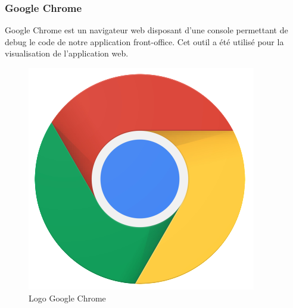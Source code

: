 \subsubsection{Google Chrome}
\noindent\begin{minipage}{0.69\textwidth}
Google Chrome est un navigateur web disposant d'une console permettant de debug le code de notre application front-office. Cet outil a été utilisé pour la visualisation de l'application web.
\end{minipage}
\begin{minipage}{0.3\textwidth}
\begin{figure}[H]
  \centering
  \includegraphics[scale=0.2]{figures/logo/chrome.png}
  \caption{Logo Google Chrome}
  \label{code26}
\end{figure}
\end{minipage}
